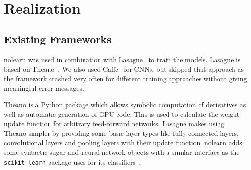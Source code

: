 
\section{Realization}\label{sec:realization}
\subsection{Existing Frameworks}\label{sec:frameworks}
nolearn was used in combination with Lasagne~\cite{sander_dieleman_2015_27878}
to train the models. Lasagne is based on Theano~\cite{Bergstra2010}. We also
used Caffe~\cite{Jia2014} for \glspl{CNN}, but skipped that approach as the
framework crashed very often for different training approaches without giving
meaningful error messages.

Theano is a Python package which allows symbolic computation of derivatives as
well as automatic generation of GPU code. This is used to calculate the weight
update function for arbitrary feed-forward networks. Lasagne makes using Theano
simpler by providing some basic layer types like fully connected layers,
convolutional layers and pooling layers with their update function. nolearn
adds some syntactic sugar and neural network objects with a similar interface
as the \verb+scikit-learn+ package uses for its classifiers~\cite{scikit-learn}.

